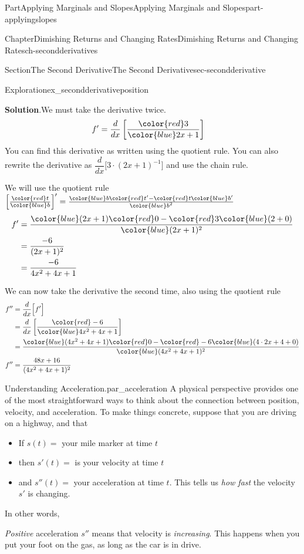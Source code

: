 \documentclass[oneside,10pt,]{tufte-book}
\newcommand{\blocktitlefont}{\relax}
\numberwithin{equation}{chapter}
\newcommand{\red}[1]{   {\color{red}   #1}   }
\newcommand{\blue}[1]{  {\color{blue}  #1}  }
\newcommand{\ddx}[1]{ \dfrac{d}{dx} \Big[ #1 \Big]  }
\newcommand{\ddxfrac}[1]{ \dfrac{d}{dx} \left[ #1 \right]  }
\newcommand{\D}[1]{ \Big[ #1 \Big]'  }
\newcommand{\amp}{&}
\begin{document}
\begin{partptx}{Part}{Applying Marginals and Slopes}{}{Applying Marginals and Slopes}{}{}{part-applyingslopes}
\begin{chapterptx}{Chapter}{Dimishing Returns and Changing Rates}{}{Dimishing Returns and Changing Rates}{}{}{ch-secondderivatives}
\begin{sectionptx}{Section}{The Second Derivative}{}{The Second Derivative}{}{}{sec-secondderivative}
\begin{exploration}{Exploration}{}{ex_secondderivativeposition}
\par\smallskip%
\noindent\textbf{\blocktitlefont Solution}.\hypertarget{ex_secondderivativeposition-2}{}\quad{}We must take the derivative twice.%
\begin{align*}
f' \amp = \ddxfrac{\frac{\red{3}}{\blue{2x+1}} } 
\end{align*}
You can find this derivative as written using the quotient rule. You can also rewrite the derivative as \(\ddx{ 3\cdot(2x+1)^{-1}}\) and use the chain rule.%
\par
We will use the quotient rule \(\D{\frac{\red{t}}{\blue{b}}} = \frac{\blue{b}\red{t'}-\red{t}\blue{b'}}{\blue{b}^2}\)%
\begin{align*}
f' \amp = \dfrac{\blue{(2x+1)}\red{0} - \red{3}\blue{(2+0)}}{\blue{(2x+1)^2}}  \\
\amp = \dfrac{-6}{(2x+1)^2}  \\
\amp = \dfrac{-6}{4x^2 + 4x + 1}  
\end{align*}
%
\par
We can now take the derivative the second time, also using the quotient rule%
\begin{align*}
f'' \amp = \ddx{f'} \\
\amp = \ddxfrac{ \dfrac{\red{-6}}{\blue{4x^2 + 4x + 1}} }\\
\amp =  \dfrac{\blue{(4x^2 + 4x + 1)}\red{0}-\red{-6}\blue{(4\cdot 2x + 4 + 0)}}{\blue{ (4x^2 + 4x + 1)^2}} \\
f'' \amp =  \dfrac{  48x + 16  }{  (4x^2 + 4x + 1)^2  } 
\end{align*}
%
\end{exploration}%
\begin{paragraphs}{Understanding Acceleration.}{par_acceleration}%
A physical perspective provides one of the most straightforward ways to think about the connection between position, velocity, and acceleration. To make things concrete, suppose that you are driving on a highway, and that%
\par
%
\begin{itemize}[label=\textbullet]
\item{}If \(s(t) = \) your mile marker at time \(t\)%
\item{}then \(s'(t) = \) is your velocity at time \(t\)%
\item{}and \(s''(t) = \) your acceleration at time \(t\). This tells us \emph{how fast} the velocity \(s'\) is changing.%
\end{itemize}
In other words,%
\par
\emph{Positive} acceleration \(s''\) means that velocity is \emph{increasing}.  This happens when you put your foot on the gas, as long as the car is in drive.%

\end{paragraphs}
\end{sectionptx}
\end{chapterptx}
\end{partptx}
\end{document}
